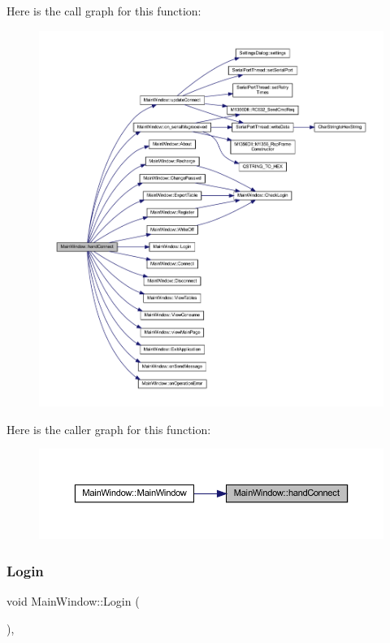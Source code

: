 Here is the call graph for this function\+:
\nopagebreak
\begin{figure}[H]
\begin{center}
\leavevmode
\includegraphics[width=350pt]{class_main_window_ad253da665707b1e03f610b2dea97976e_cgraph}
\end{center}
\end{figure}
Here is the caller graph for this function\+:
\nopagebreak
\begin{figure}[H]
\begin{center}
\leavevmode
\includegraphics[width=350pt]{class_main_window_ad253da665707b1e03f610b2dea97976e_icgraph}
\end{center}
\end{figure}
\mbox{\label{class_main_window_a27370c71ccd518528509731b5d19e904}} 
\subsubsection{\texorpdfstring{Login}{Login}}
{\footnotesize\ttfamily void Main\+Window\+::\+Login (\begin{DoxyParamCaption}{ }\end{DoxyParamCaption})\hspace{0.3cm}{\ttfamily [private]}, {\ttfamily [slot]}}



